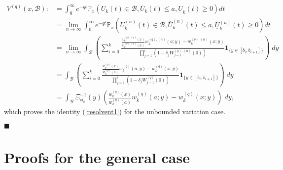 \documentclass[12pt,reqno]{amsart}
\theoremstyle{definition}
\theoremstyle{remark}
\newcommand{\ind}{\mathbf{1}}
\begin{document}
\begin{align*}
V^{(q)}(x,\mathcal{B}):&=\int_0^{\infty}e^{-qt}\mathbb{P}_x\left(U_k(t)\in \mathcal{B}, \overline{U}_k(t)\leq a, \underline{U}_k(t)\geq 0\right)dt\\
&=\lim_{n\to\infty}\int_0^{\infty}e^{-qt}\mathbb{P}_x\left(U^{(n)}_k(t)\in \mathcal{B}, \overline{U}^{(n)}_k(t)\leq a, \underline{U}^{(n)}_k(t)\geq 0\right)dt\\
&=\lim_{n\to\infty}\int_{\mathcal{B}}\left(\sum_{i=0}^{k} \frac{\frac{w_k^{(q),(n)}(x)}{w_k^{(q),(n)}(a)}w_k^{(q),(n)}(a;y)-w_k^{(q),(n)}(x;y)}
{\prod_{j=1}^i\left(1-\delta_j W_{j-1}^{(q),(n)}(0)\right)}\ind_{\{y\in [b_i,b_{i+1}]\}} \right)\;dy\\
&=\int_{\mathcal{B}}\left(\sum_{i=0}^{k} \frac{\frac{w_k^{(q)}(x)}{w_k^{(q)}(a)}w_k^{(q)}(a;y)-w_k^{(q)}(x;y)}
{\prod_{j=1}^i\left(1-\delta_j W_{j-1}^{(q)}(0)\right)}\ind_{\{y\in [b_i,b_{i+1}]\}} \right)\;dy \\
&=\int_{\mathcal{B}} \Xi_{\phi_k}^{-1}(y)\left(\frac{w_k^{(q)}(x)}{w_k^{(q)}(a)}w_k^{(q)}(a;y)-w_k^{(q)}(x;y)\right)\;dy,
\end{align*}
which proves the identity (\ref{resolvent1}) for the unbounded variation case. \begin{flushright}$\blacksquare$\end{flushright}



\section{Proofs for the general case}\label{Generalcase}
\end{document}
